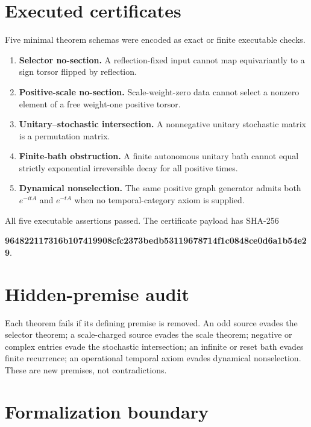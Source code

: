 \documentclass[11pt,a4paper,openany]{report}
\begin{document}
\section{Executed certificates}

Five minimal theorem schemas were encoded as exact or finite executable checks.

\begin{enumerate}
\item 
\textbf{Selector no-section.} A reflection-fixed input cannot map equivariantly to a sign torsor flipped by reflection.

\item 
\textbf{Positive-scale no-section.} Scale-weight-zero data cannot select a nonzero element of a free weight-one positive torsor.

\item 
\textbf{Unitary–stochastic intersection.} A nonnegative unitary stochastic matrix is a permutation matrix.

\item 
\textbf{Finite-bath obstruction.} A finite autonomous unitary bath cannot equal strictly exponential irreversible decay for all positive times.

\item 
\textbf{Dynamical nonselection.} The same positive graph generator admits both \(e^{-itA}\) and \(e^{-tA}\) when no temporal-category axiom is supplied.

\end{enumerate}

All five executable assertions passed. The certificate payload has SHA-256

\textbf{964822117316b107419908cfc2373bedb53119678714f1c0848ce0d6a1b54e29}.

\section{Hidden-premise audit}

Each theorem fails if its defining premise is removed. An odd source evades the selector theorem; a scale-charged source evades the scale theorem; negative or complex entries evade the stochastic intersection; an infinite or reset bath evades finite recurrence; an operational temporal axiom evades dynamical nonselection. These are new premises, not contradictions.

\section{Formalization boundary}
\end{document}
